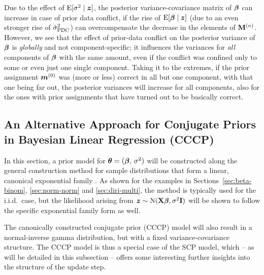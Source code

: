 Due to the effect of $\operatorname{E}[\sigma^2\mid {\bm z}]$, the posterior variance-covariance matrix
of $\boldsymbol{\beta}$ can increase in case of prior data conflict, if the rise of $\operatorname{E}[\boldsymbol{\beta}\mid {\bm z}]$
(due to an even stronger rise of $\hat{\sigma}^2_\text{PDC}$) can overcompensate the decrease in the elements of $\mathbf{M}^{(n)}$.
However, we see that the effect of prior-data conflict on the posterior variance of $\boldsymbol{\beta}$ %
is \emph{globally} and not component-specific; it influences the variances for \emph{all} components of $\boldsymbol{\beta}$
with the same amount, even if the conflict was confined only to some or even just one single component.
Taking it to the extremes, if the prior assignment ${\bm m}^{(0)}$ was (more or less) correct in all but one component,
with that one being far out, the posterior variances will increase for all components,
also for the ones with prior assignments that have turned out to be basically correct.

\subsection{An Alternative Approach for Conjugate Priors in Bayesian Linear Regression (CCCP)}
\label{sec:cccp}


In this section, a prior model for $\boldsymbol{\theta} = (\boldsymbol{\beta},\,\sigma^2)$ will be constructed
along the general construction method for sample distributions that form a
linear, canonical exponential family
\parencite[see the canical conjugates framework in Section~\ref{sec:regularconjugates}, and, e.g.,][]{2000:bernardosmith}.
%
As shown for the examples in Sections~\ref{sec:beta-binom}, \ref{sec:norm-norm} and \ref{sec:diri-multi},
the method is typically used for the i.i.d.\ case, but the likelihood arising from
${\bm z} \sim \operatorname{N}(\mathbf{X}\boldsymbol{\beta}, \sigma^2\mathbf{I})$ will be shown to follow the specific
exponential family form as well.

The canonically constructed conjugate prior (CCCP) model will
also result in a normal-inverse gamma distribution, but with a fixed variance-covariance structure.
The CCCP model is thus a special case of the SCP model, which -- as will be detailed in this subsection --
offers some interesting further insights into the structure of the update step.

